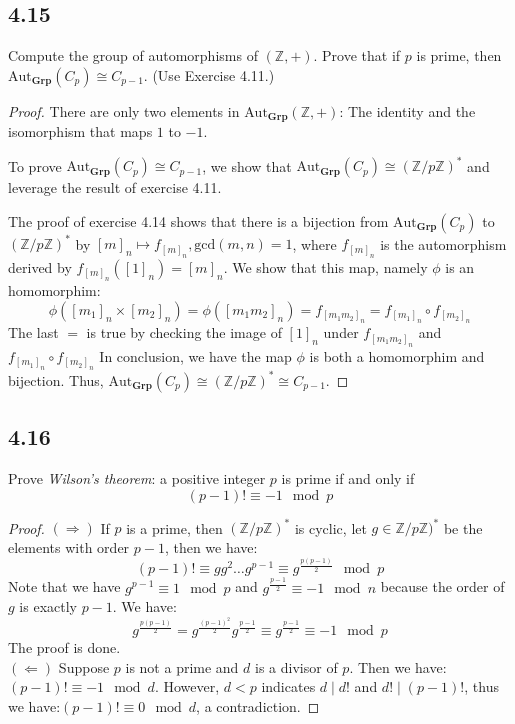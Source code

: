 \documentclass[a4paper, pdf, 12pt]{article}
\newcommand{\divides}{\mid}
\begin{document}
\subsection*{4.15}
Compute the group of automorphisms of $(\mathbb{Z}, +)$. Prove that if $p$ is prime,
then $\mbox{Aut}_{\mathbf{Grp}}(C_p) \cong C_{p-1}$. (Use Exercise 4.11.)

\begin{proof}
  There are only two elements in $\mbox{Aut}_{\mathbf{Grp}}(\mathbb{Z}, +)$: The identity and the isomorphism that maps $1$ to $-1$.

  \noindent To prove $\mbox{Aut}_{\mathbf{Grp}}(C_{p})\cong C_{p-1}$, we show that
  $\mbox{Aut}_{\mathbf{Grp}}(C_{p})\cong (\mathbb{Z}/p\mathbb{Z})^{*}$ and leverage the result of
  exercise 4.11.

  The proof of exercise 4.14 shows that there is a bijection from $\mbox{Aut}_{\mathbf{Grp}}(C_p)$ to $(\mathbb{Z}/p\mathbb{Z})^{*}$ by $[m]_{n}\mapsto f_{[m]_{n}}, \mbox{gcd}(m,n)=1$, where
  $f_{[m]_{n}}$ is the automorphism derived by $f_{[m]_{n}}([1]_{n}) = [m]_{n}$. We show that this map, namely $\phi$ is an homomorphim:
  $$
    \phi([m_1]_{n}\times[m_2]_{n})=\phi([m_1m_2]_{n}) = f_{[m_1m_2]_{n}}=f_{[m_1]_{n}}\circ f_{[m_2]_{n}}
  $$
  The last $=$ is true by checking the image of $[1]_{n}$ under $f_{[m_1m_2]_{n}}$ and $f_{[m_1]_{n}}\circ f_{[m_2]_{n}}$
  In conclusion, we have the map $\phi$ is both a homomorphim and bijection. Thus, $\mbox{Aut}_{\mathbf{Grp}}(C_p)\cong (\mathbb{Z}/p\mathbb{Z})^{*}\cong C_{p-1}$.
\end{proof}

\subsection*{4.16}
Prove \textit{Wilson's theorem}: a positive integer $p$ is prime if and only if
$$(p-1)! \equiv -1 \mod{p} $$

\begin{proof}
  $(\Rightarrow)$ If $p$ is a prime, then $(\mathbb{Z}/p\mathbb{Z})^{*}$ is cyclic, let $g\in \mathbb{Z}/p\mathbb{Z})^{*}$ be the elements with order $p-1$, then we have:
  $$
    (p-1)! \equiv gg^{2}\dots g^{p-1}\equiv g^{\frac{p(p-1)}{2}} \mod{p}
  $$
  Note that we have $g^{p-1}\equiv 1\mod{p}$ and $g^{\frac{p-1}{2}}\equiv -1\mod{n}$ because the order of $g$ is exactly $p-1$. We have:
  $$
    g^{\frac{p(p-1)}{2}} = g^{\frac{(p-1)^{2}}{2}}g^{\frac{p-1}{2}}\equiv g^{\frac{p-1}{2}}\equiv -1\mod{p}
  $$
  The proof is done.\\

  \noindent
  $(\Leftarrow)$ Suppose $p$ is not a prime and $d$ is a divisor of $p$. Then we have:$(p-1)!\equiv -1\mod{d}$. However,
  $d < p$ indicates $d \divides d!$ and $d! \divides (p-1)!$, thus we have:$(p-1)!\equiv 0\mod{d}$, a contradiction.
\end{proof}
\end{document}
